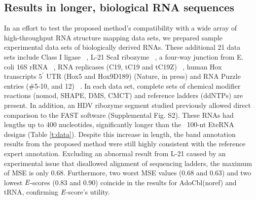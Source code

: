 \subsection{Results in longer, biological RNA sequences}
In an effort to test the proposed method's compatibility with a wide array of high-throughput RNA structure mapping data sets, we prepared sample experimental data sets of biologically derived RNAs. These additional 21 data sets include Class I ligase ~\citep{Bagby01122009}, L-21 ScaI ribozyme ~\citep{Shi2009}, a four-way junction from E. coli 16S rRNA ~\citep{tian2014nature}, RNA replicases (C19, tC19 and tC19Z) ~\citep{Wochner08042011}, human Hox transcripts $5^\prime$ UTR (Hox5 and Hox9D189) (Nature, in press) and RNA Puzzle entries (\#5-10, and 12) ~\citep{Cruz01042012}. In each data set, complete sets of chemical modifier reactions (nomod, SHAPE, DMS, CMCT) and reference ladders (ddNTPs) are present. In addition, an HDV ribozyme segment studied previously \citep{Pang2011} allowed direct comparison to the FAST software (Supplemental Fig. S2). These RNAs had lengths up to 400 nucleotides, significantly longer than the ~100-nt EteRNA designs (Table \ref{t:data}). Despite this increase in length, the band annotation results from the proposed method were still highly consistent with the reference expert annotation. Excluding an abnormal result from L-21 caused by an experimental issue that disallowed alignment of sequencing ladders, the maximum of MSE is only 0.68. Furthermore, two worst MSE values (0.68 and 0.63) and two lowest ${\emph{E}}$-scores (0.83 and 0.90) coincide in the results for AdoCbl(noref) and tRNA, confirming ${\emph{E}}$-score's utility. 

